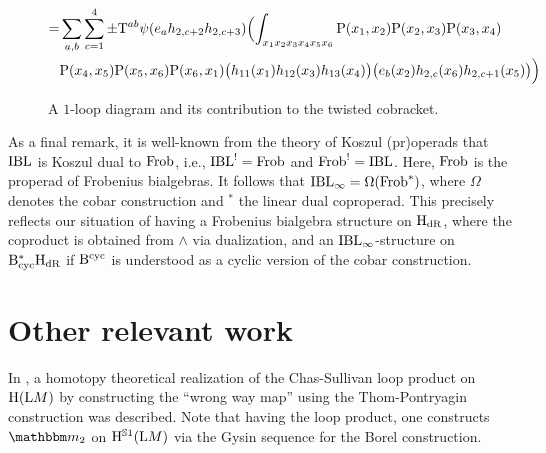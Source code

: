 \documentclass[\MainFolder/Text.tex]{subfiles}
\begin{document}
\begin{figure}[t]
\[\begin{aligned}
=&\sum_{a,b}\sum_{c=1}^4 \pm  \mathrm{T}^{ab} \psi(e_a  h_{2,c+2}  h_{2,c+3})  \Bigl(\int_{x_1 x_2 x_3 x_4 x_5 x_6} \mathrm{P}(x_1,x_2)\mathrm{P}(x_2,x_3)\mathrm{P}(x_3,x_4)\\
&\mathrm{P}(x_4,x_5)\mathrm{P}(x_5,x_6)\mathrm{P}(x_6,x_1)\bigl( h_{11}(x_1) h_{12}(x_3)
h_{13}(x_4)\bigr)\bigl(e_b(x_2)  h_{2,c}(x_6)  h_{2,c+1}(x_5)\bigr)\Bigr)
\end{aligned}
\]
\caption{A $1$-loop diagram and its contribution to the twisted cobracket.}
\label{Fig:OneLoopDiag}
\end{figure}

As a final remark, it is well-known from the theory of Koszul (pr)operads that $\mathrm{IBL}$ is Koszul dual to $\mathrm{Frob}$, i.e., $\mathrm{IBL}^! = \mathrm{Frob}$ and $\mathrm{Frob}^! = \mathrm{IBL}$. 
Here, $\mathrm{Frob}$ is the properad of Frobenius bialgebras.
It follows that $\mathrm{IBL}_\infty = \Omega(\mathrm{Frob}^*)$, where $\Omega$ denotes the cobar construction and ${}^*$ the linear dual coproperad.
This precisely reflects our situation of having a Frobenius bialgebra structure on $\mathrm{H}_{\mathrm{dR}}$, where the coproduct is obtained from $\wedge$ via dualization, and an $\mathrm{IBL}_\infty$-structure on $\mathrm{B}_{\mathrm{cyc}}^* \mathrm{H}_{\mathrm{dR}}$ if $\mathrm{B}^{\mathrm{cyc}}$ is understood as a cyclic version of the cobar construction.

\section{Other relevant work}

In \cite{Cohen2001}, a homotopy theoretical realization of the Chas-Sullivan loop product on $\mathrm{H}(\mathrm{L} M)$ by constructing the ``wrong way map'' using the Thom-Pontryagin construction was described.
Note that having the loop product, one constructs $\StringOp_2$ on $\mathrm{H}^{\mathbb{S}{1}}(\mathrm{L} M)$ via the Gysin sequence for the Borel construction.
\end{document}

